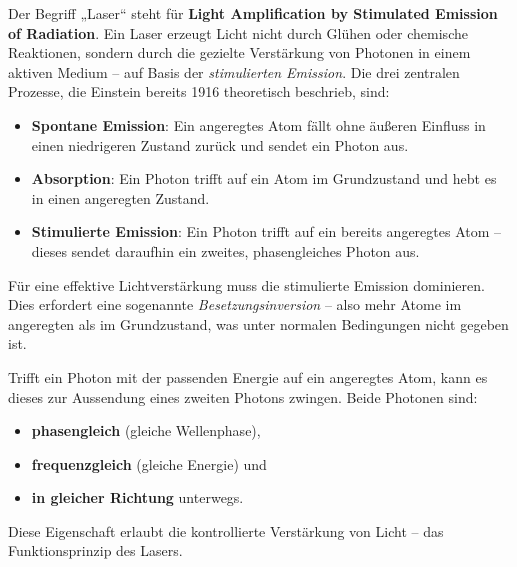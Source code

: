 Der Begriff „Laser“ steht für \textbf{Light Amplification by Stimulated Emission of Radiation}. Ein Laser erzeugt Licht nicht durch Glühen oder chemische Reaktionen, sondern durch die gezielte Verstärkung von Photonen in einem aktiven Medium – auf Basis der \emph{stimulierten Emission}.
\newpage
\noindent
Die drei zentralen Prozesse, die Einstein bereits 1916 theoretisch beschrieb, sind:

\begin{itemize}
	\item \textbf{Spontane Emission}: Ein angeregtes Atom fällt ohne äußeren Einfluss in einen niedrigeren Zustand zurück und sendet ein Photon aus.
	\item \textbf{Absorption}: Ein Photon trifft auf ein Atom im Grundzustand und hebt es in einen angeregten Zustand.
	\item \textbf{Stimulierte Emission}: Ein Photon trifft auf ein bereits angeregtes Atom – dieses sendet daraufhin ein zweites, phasengleiches Photon aus.
\end{itemize}

Für eine effektive Lichtverstärkung muss die stimulierte Emission dominieren. Dies erfordert eine sogenannte \emph{Besetzungsinversion} – also mehr Atome im angeregten als im Grundzustand, was unter normalen Bedingungen nicht gegeben ist.

\vspace{1em}
\begin{tcolorbox}[physikbox, title={Stimulierte Emission als Grundlage des Lasers}]
	\label{box:grundlagedeslaser}
	Trifft ein Photon mit der passenden Energie auf ein angeregtes Atom, kann es dieses zur Aussendung eines zweiten Photons zwingen. Beide Photonen sind:
	\begin{itemize}
		\item \textbf{phasengleich} (gleiche Wellenphase),
		\item \textbf{frequenzgleich} (gleiche Energie) und
		\item \textbf{in gleicher Richtung} unterwegs.
	\end{itemize}
	Diese Eigenschaft erlaubt die kontrollierte Verstärkung von Licht – das Funktionsprinzip des Lasers.
\end{tcolorbox}
\newpage
\noindent
